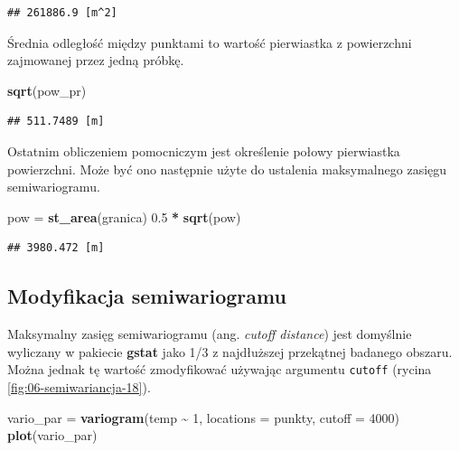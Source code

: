\documentclass[
  paper=6in:9in,pagesize=pdftex,headinclude=on,footinclude=on,10pt]{scrbook}
\newenvironment{Shaded}{\begin{snugshade}}{\end{snugshade}}
\newcommand{\AttributeTok}[1]{\textcolor[rgb]{0.13,0.29,0.53}{#1}}
\newcommand{\DecValTok}[1]{\textcolor[rgb]{0.00,0.00,0.81}{#1}}
\newcommand{\FloatTok}[1]{\textcolor[rgb]{0.00,0.00,0.81}{#1}}
\newcommand{\FunctionTok}[1]{\textcolor[rgb]{0.13,0.29,0.53}{\textbf{#1}}}
\newcommand{\NormalTok}[1]{#1}
\newcommand{\OtherTok}[1]{\textcolor[rgb]{0.56,0.35,0.01}{#1}}
\newcommand{\SpecialCharTok}[1]{\textcolor[rgb]{0.81,0.36,0.00}{\textbf{#1}}}
\begin{document}
\begin{verbatim}
## 261886.9 [m^2]
\end{verbatim}

Średnia odległość między punktami to wartość pierwiastka z powierzchni zajmowanej przez jedną próbkę.

\begin{Shaded}
\begin{Highlighting}[]
\FunctionTok{sqrt}\NormalTok{(pow\_pr)}
\end{Highlighting}
\end{Shaded}

\begin{verbatim}
## 511.7489 [m]
\end{verbatim}

Ostatnim obliczeniem pomocniczym jest określenie połowy pierwiastka powierzchni.
Może być ono następnie użyte do ustalenia maksymalnego zasięgu semiwariogramu.

\begin{Shaded}
\begin{Highlighting}[]
\NormalTok{pow }\OtherTok{=} \FunctionTok{st\_area}\NormalTok{(granica)}
\FloatTok{0.5} \SpecialCharTok{*} \FunctionTok{sqrt}\NormalTok{(pow)}
\end{Highlighting}
\end{Shaded}

\begin{verbatim}
## 3980.472 [m]
\end{verbatim}

\subsection{Modyfikacja semiwariogramu}\label{modyfikacja-semiwariogramu}

Maksymalny zasięg semiwariogramu (ang. \emph{cutoff distance}) jest domyślnie wyliczany w pakiecie \textbf{gstat} jako 1/3 z najdłuższej przekątnej badanego obszaru.
Można jednak tę wartość zmodyfikować używając argumentu \texttt{cutoff} (rycina \ref{fig:06-semiwariancja-18}).

\begin{Shaded}
\begin{Highlighting}[]
\NormalTok{vario\_par }\OtherTok{=} \FunctionTok{variogram}\NormalTok{(temp }\SpecialCharTok{\textasciitilde{}} \DecValTok{1}\NormalTok{, }\AttributeTok{locations =}\NormalTok{ punkty,}
                      \AttributeTok{cutoff =} \DecValTok{4000}\NormalTok{)}
\FunctionTok{plot}\NormalTok{(vario\_par)}
\end{Highlighting}
\end{Shaded}
\end{document}
